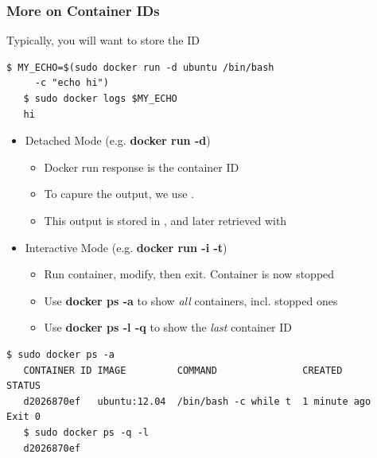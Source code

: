 \documentclass[xcolor=dvipsnames]{beamer}
\begin{document}
\begin{frame}[fragile]
  \frametitle{More on Container IDs}

  \vspace{-2mm}
  Typically, you will want to store the ID

  \begin{lstlisting}[basicstyle=\tiny]
   $ MY_ECHO=$(sudo docker run -d ubuntu /bin/bash 
     -c "echo hi")
   $ sudo docker logs $MY_ECHO
   hi
  \end{lstlisting}

  \begin{itemize}
  \item Detached Mode (e.g. \textbf{docker run -d})
    \begin{itemize}
    \item Docker run response is the container ID
    \item To capure the output, we use .
    \item This output is stored in , and later retrieved with 
    \end{itemize}
  \item Interactive Mode (e.g. \textbf{docker run -i -t})
    \begin{itemize}
    \item Run container, modify, then exit. Container is now stopped
    \item Use \textbf{docker ps -a} to show \textit{all} containers, incl. stopped ones
    \item Use \textbf{docker ps -l -q} to show the \textit{last} container ID
    \end{itemize}
  \end{itemize}

  \begin{lstlisting}[basicstyle=\tiny]
   $ sudo docker ps -a
   CONTAINER ID IMAGE         COMMAND               CREATED        STATUS    
   d2026870ef   ubuntu:12.04  /bin/bash -c while t  1 minute ago   Exit 0  
   $ sudo docker ps -q -l
   d2026870ef
  \end{lstlisting}   

\end{frame}
\end{document}
